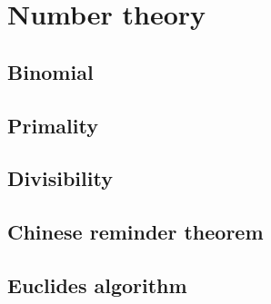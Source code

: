 
\chapter{Number theory}
	\section{Binomial}

\section{Primality}

\section{Divisibility}

\section{Chinese reminder theorem}

\section{Euclides algorithm}

